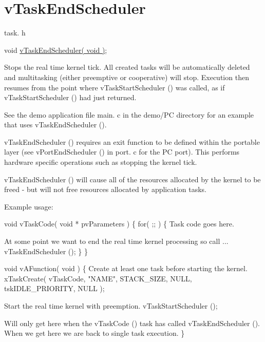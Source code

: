 \hypertarget{group__v_task_end_scheduler}{\section{v\-Task\-End\-Scheduler}
\label{group__v_task_end_scheduler}
}
task. h 
\begin{DoxyPre}void \hyperlink{tasks_8c_aeadc53d3d0d0ea3a6c7702a9eacbf452}{vTaskEndScheduler( void )};\end{DoxyPre}


Stops the real time kernel tick. All created tasks will be automatically deleted and multitasking (either preemptive or cooperative) will stop. Execution then resumes from the point where v\-Task\-Start\-Scheduler () was called, as if v\-Task\-Start\-Scheduler () had just returned.

See the demo application file main. c in the demo/\-P\-C directory for an example that uses v\-Task\-End\-Scheduler ().

v\-Task\-End\-Scheduler () requires an exit function to be defined within the portable layer (see v\-Port\-End\-Scheduler () in port. c for the P\-C port). This performs hardware specific operations such as stopping the kernel tick.

v\-Task\-End\-Scheduler () will cause all of the resources allocated by the kernel to be freed -\/ but will not free resources allocated by application tasks.

Example usage\-: 
\begin{DoxyPre}
 void vTaskCode( void * pvParameters )
 \{
     for( ;; )
     \{
Task code goes here.\end{DoxyPre}



\begin{DoxyPre}At some point we want to end the real time kernel processing
so call ...
         vTaskEndScheduler ();
     \}
 \}\end{DoxyPre}



\begin{DoxyPre} void vAFunction( void )
 \{
Create at least one task before starting the kernel.
     xTaskCreate( vTaskCode, "NAME", STACK\_SIZE, NULL, tskIDLE\_PRIORITY, NULL );\end{DoxyPre}



\begin{DoxyPre}Start the real time kernel with preemption.
     vTaskStartScheduler ();\end{DoxyPre}



\begin{DoxyPre}Will only get here when the vTaskCode () task has called
vTaskEndScheduler ().  When we get here we are back to single task
execution.
 \}
   \end{DoxyPre}
 